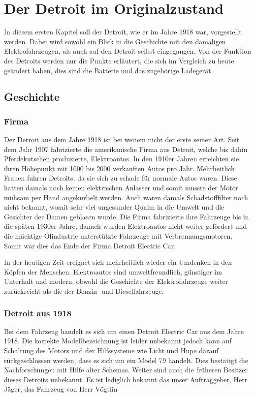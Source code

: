 \chapter{Der Detroit im Originalzustand}
In diesem ersten Kapitel soll der Detroit, wie er im Jahre 1918 war, vorgestellt werden. Dabei wird sowohl ein Blick in die Geschichte mit den damaligen Elektrofahrzeugen, als auch auf den Detroit selbst eingegangen. Von der Funktion des Detroits werden nur die Punkte erläutert, die sich im Vergleich zu heute geändert haben, dies sind die Batterie und das zugehörige Ladegerät.

\section{Geschichte}

\subsection{Firma}

Der Detroit aus dem Jahre 1918 ist bei weitem nicht der erste seiner Art. Seit dem Jahr 1907 fabrizierte die amerikanische Firma aus Detroit, welche bis dahin Pferdekutschen produzierte, Elektroautos. In den 1910er Jahren erreichten sie ihren Höhepunkt mit 1000 bis 2000 verkauften Autos pro Jahr. Mehrheitlich Frauen fuhren Detroits, da sie sich zu schade für normale Autos waren. Diese hatten damals noch keinen elektrischen Anlasser und somit musste der Motor mühsam per Hand angekurbelt werden. Auch waren damals Schadstofffilter noch nicht bekannt, womit sehr viel ungesunder Qualm in die Umwelt und die Gesichter der Damen geblasen wurde. Die Firma fabrizierte ihre Fahrzeuge bis in die späten 1930er Jahre, danach wurden Elektroautos nicht weiter gefördert und die mächtige Ölindustrie unterstützte Fahrzeuge mit Verbrennungsmotoren. Somit war dies das Ende der Firma Detroit Electric Car.

In der heutigen Zeit ereignet sich mehrheitlich wieder ein Umdenken in den Köpfen der Menschen. Elektroautos sind umweltfreundlich, günstiger im Unterhalt und modern, obwohl die Geschichte der Elektrofahrzeuge weiter zurückreicht als die der Benzin- und Dieselfahrzeuge.

\subsection{Detroit aus 1918}

Bei dem Fahrzeug handelt es sich um einen Detroit Electric Car aus dem Jahre 1918. Die korrekte Modellbezeichnung ist leider unbekannt jedoch kann auf Schaltung des Motors und der Hilfssysteme wie Licht und Hupe darauf rückgeschlossen werden, dass es sich um ein Model 79 handelt. Dies bestätigt die Nachforschungen mit Hilfe alter Schemas. Weiter sind auch die früheren Besitzer dieses Detroits unbekannt. Es ist lediglich bekannt das unser Auftraggeber, Herr Jäger, das Fahrzeug von Herr Vögtlin 

\newpage
